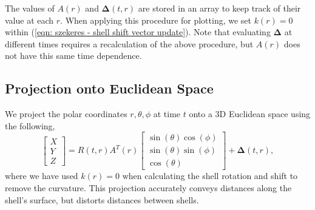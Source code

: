 \documentclass[a4paper,12pt]{report}
\begin{document}
The values of $A(r)$ and $\bm{\Delta}(t,r)$ are stored in an array to keep track of their value at each $r$. When applying this procedure for plotting, we set $k(r)=0$ within (\ref{eqn: szekeres - shell shift vector update}). Note that evaluating $\bm{\Delta}$ at different times requires a recalculation of the above procedure, but $A(r)$ does not have this same time dependence.

\subsection{Projection onto Euclidean Space}
We project the polar coordinates $r,\theta,\phi$ at time $t$ onto a 3D Euclidean space using the following,
\begin{equation} \label{eqn: szekeres - projection to cartesian}
  \begin{bmatrix}
    X \\ Y \\ Z
  \end{bmatrix}
  = R(t,r)A^T(r)
  \begin{bmatrix}
    \sin(\theta)\cos(\phi) \\ \sin(\theta)\sin(\phi) \\ \cos(\theta)
  \end{bmatrix}
  + \bm{\Delta}(t,r),
\end{equation}
where we have used $k(r)=0$ when calculating the shell rotation and shift to remove the curvature. This projection accurately conveys distances along the shell's surface, but distorts distances between shells.
\end{document}
